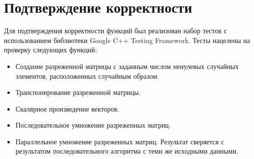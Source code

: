 \documentclass{report}
\begin{document}
\section*{Подтверждение корректности}
Для подтверждения корректности функций был реализован набор тестов с использованием библиотеки Google C++ Testing Framework. Тесты нацелены на проверку следующих функций:
\begin {itemize}
	\item Создание разреженной матрицы с заданным числом ненулевых случайных элементов, расположенных случайным образом.
	\item Транспонирование разреженной матрицы.
	\item Скалярное произведение векторов.
	\item Последовательное умножение разреженных матриц.
	\item Параллельное умножение разреженных матриц. Результат сверяется с результатом последовательного алгоритма с теми же исходными данными.
\end {itemize}
\newpage


\end{document}
